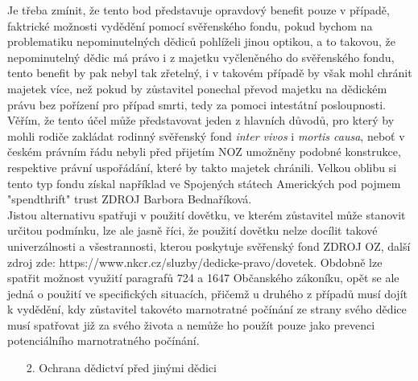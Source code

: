 \documentclass{article}
\begin{document}
 
 Je třeba zmínit, že tento bod představuje opravdový benefit pouze v případě, faktrické možnosti vydědění pomocí svěřenského fondu, pokud bychom na problematiku nepominutelných dědiců pohlíželi jinou optikou, a to takovou, že nepominutelný dědic má právo i z majetku vyčleněného do svěřenského fondu, tento benefit by pak nebyl tak zřetelný, i v takovém případě by však mohl chránit majetek více, než pokud by zůstavitel ponechal převod majetku na dědickém právu bez pořízení pro případ smrti, tedy za pomoci intestátní posloupnosti.\\
 
 Věřím, že tento účel může představovat jeden z hlavních důvodů, pro který by mohli rodiče zakládat rodinný svěřenský fond \textit{inter vivos} i \textit{mortis causa}, neboť v českém právním řádu nebyli před přijetím NOZ umožněny podobné konstrukce, respektive právní uspořádání, které by takto majetek chránili. Velkou oblibu si tento typ fondu získal například ve Spojených státech Amerických pod pojmem "spendthrift" trust ZDROJ Barbora Bednaříková.\\
 
 Jistou alternativu spatřuji v použití dovětku, ve kterém zůstavitel může stanovit určitou podmínku, lze ale jasně říci, že použití dovětku nelze docílit takové univerzálnosti a všestrannosti, kterou poskytuje svěřenský fond ZDROJ OZ, další zdroj zde: https://www.nkcr.cz/sluzby/dedicke-pravo/dovetek. Obdobně lze spatřit možnost využití paragrafů 724 a 1647 Občanského zákoníku, opět se ale jedná o použití ve specifických situacích, přičemž u druhého z případů musí dojít k vydědění, kdy zůstavitel takovéto marnotratné počínání ze strany svého dědice musí spatřovat již za svého života a nemůže ho použít pouze jako prevenci potenciálního marnotratného počínání.\\
 
 \begin{enumerate}
 \item[2.] Ochrana dědictví před jinými dědici
 \end{enumerate}
 
\end{document}
